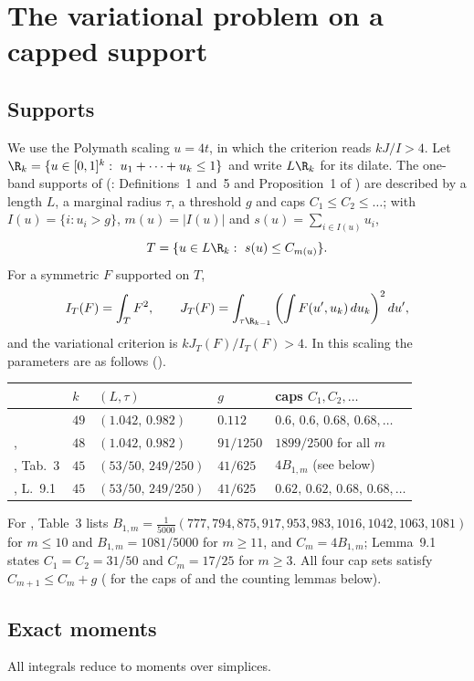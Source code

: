 \section{The variational problem on a capped support}

\subsection*{Supports}
We use the Polymath scaling $u=4t$, in which the criterion reads $kJ/I>4$. Let
$\R_k=\{u\in[0,1]^k:\ u_1+\dots+u_k\le1\}$ and write $L\R_k$ for its dilate.
The one-band supports of \cite{Sta26} (: Definitions~1
and~5 and Proposition~1 of \cite{Sta26}) are described by a length $L$, a marginal radius
$\tau$, a threshold $g$ and caps $C_1\le C_2\le\dots$; with
$I(u)=\{i:u_i>g\}$, $m(u)=|I(u)|$ and $s(u)=\sum_{i\in I(u)}u_i$,
\[
T=\{u\in L\R_k:\ s(u)\le C_{m(u)}\}.
\]
For a symmetric $F$ supported on $T$,
\[
I_T(F)=\int_TF^2,\qquad
J_T(F)=\int_{\tau\R_{k-1}}\left(\int F(u',u_k)\,du_k\right)^2du',
\]
and the variational criterion is $kJ_T(F)/I_T(F)>4$. In this scaling the
parameters are as follows ().
\begin{center}\small
\begin{tabular}{@{}lllll@{}}
\toprule
 & $k$ & $(L,\tau)$ & $g$ & caps $C_1,C_2,\dots$\\
\midrule
\cite{Sta26} & $49$ & $(1.042,\,0.982)$ & $0.112$ & $0.6,\,0.6,\,0.68,\,0.68,\dots$\\
\cite{Kin26}, \cite{SY26} & $48$ & $(1.042,\,0.982)$ & $91/1250$ & $1899/2500$ for all $m$\\
\cite{Cha26}, Tab.~3 & $45$ & $(53/50,\,249/250)$ & $41/625$ & $4B_{1,m}$ (see below)\\
\cite{Cha26}, L.~9.1 & $45$ & $(53/50,\,249/250)$ & $41/625$ & $0.62,\,0.62,\,0.68,\,0.68,\dots$\\
\bottomrule
\end{tabular}
\end{center}
For \cite{Cha26}, Table~3 lists
$B_{1,m}=\frac1{5000}(777,794,875,917,953,983,1016,1042,1063,1081)$ for
$m\le10$ and $B_{1,m}=1081/5000$ for $m\ge11$, and $C_m=4B_{1,m}$; Lemma~9.1
states $C_1=C_2=31/50$ and $C_m=17/25$ for $m\ge3$. All four cap sets satisfy
$C_{m+1}\le C_m+g$ ( for the caps of \cite{Cha26} and the
counting lemmas below).

\subsection*{Exact moments}
All integrals reduce to moments over simplices.

